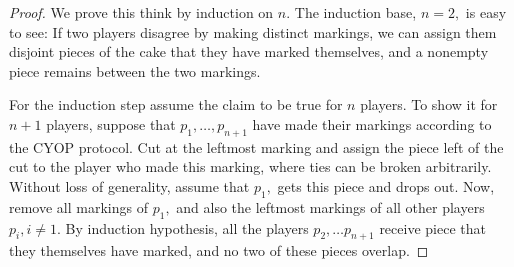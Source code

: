\documentclass[a4paper, 12pt]{article}
\begin{document}
\begin{proof}
We prove this think by induction on $n.$ The induction base, $n= 2,$ is easy to see: If two players disagree by making distinct markings, we can assign them disjoint pieces of the cake that they have marked themselves, and a nonempty piece remains between the two markings. 

For the induction step assume the claim to be true for $n$ players. To show it for $n + 1$ players, suppose that $p_1, \ldots, p_{n+1}$ have made their markings according to the CYOP protocol. Cut at the leftmost marking and assign the piece left of the cut to the player who made this marking, where ties can be broken arbitrarily. Without loss of generality, assume that $p_1,$ gets this piece and drops out. Now, remove all markings of $p_1,$ and also the leftmost markings of all other players $p_i, i \neq 1.$ By induction hypothesis, all the players $p_2, \ldots p_{n+1}$  receive piece that they themselves have marked, and no two of these pieces overlap. 


\end{proof}
\end{document}
